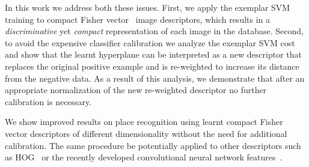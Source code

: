 \documentclass[table]{article} %
\begin{document}

In this work we address both these issues. 
First, we apply the exemplar SVM training to compact Fisher vector~\cite{Jegou2011,Perronnin2010} image descriptors, which results in a {\em discriminative} yet {\em compact} representation of each image in the database.  
Second, to avoid the expensive classifier calibration we analyze the exemplar SVM cost and show that the learnt hyperplane can be interpreted
as a new descriptor that replaces the original positive example and is re-weighted to increase its distance from the negative data.
As a result of this analysis, we demonstrate that after an appropriate normalization of the new re-weighted descriptor no further calibration is necessary.

We show improved results on place recognition using learnt compact Fisher vector descriptors of different dimensionality without the need for additional calibration.  
The same procedure be potentially applied to other descriptors such as HOG~\cite{Dalal05} or the recently developed convolutional neural network features~\cite{Donahue13,Krizhevsky12,Oquab14,Sermanet13}.      
\end{document}
